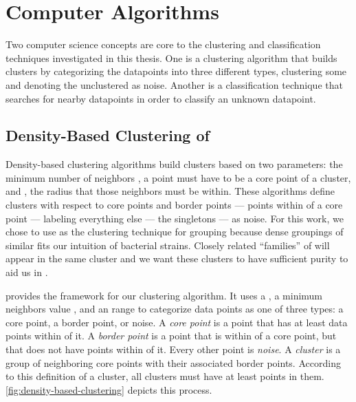 \section{Computer Algorithms}
Two computer science concepts are core to the clustering and classification techniques investigated in this thesis.
One is a clustering algorithm that builds clusters by categorizing the datapoints into three different types, clustering some and denoting the unclustered as noise.
Another is a classification technique that searches for nearby datapoints in order to classify an unknown datapoint.


\subsection{Density-Based Clustering of \Isols{}}\label{sec:background:dbscan}
Density-based clustering algorithms build clusters based on two parameters: the minimum number of neighbors \minneigh{},  a point must have to be a core point of a cluster, and \eps{}, the radius that those neighbors must be within. 
These algorithms define clusters with respect to core points and border points --- points within \eps{} of a core point --- labeling everything else --- the singletons --- as noise.
For this work, we chose to use \dbscan{} as the clustering technique for grouping \isols{} because dense groupings of similar \isols{} fits our intuition of bacterial \isol{} strains.
Closely related ``families'' of \isols{} will appear in the same cluster and we want these clusters to have sufficient purity to aid us in \mst{}.


\dbscan{}\cite{ester1996density} provides the framework for our clustering algorithm. 
It uses a \distmetric{}, a minimum neighbors value \minneigh{}, and an \eps{} range to categorize data points as one of three types:
\index{\dbscan{}}
\index{\distmetric{}}
\index{\minneigh{}}
\index{\eps{}}
a core point, a border point, or noise.
A \textit{core point} is a point that has at least \minneigh{} data points within \eps{} of it. 
A \textit{border point} is a point that is within \eps{} of a core point, but that does not have \minneigh{} points within \eps{} of it.
Every other point is \textit{noise}. 
A \textit{cluster} is a group of neighboring core points with their associated border points.
According to this definition of a cluster, all clusters must have at least \minneigh{} points in them.
\autoref{fig:density-based-clustering} depicts this process.


